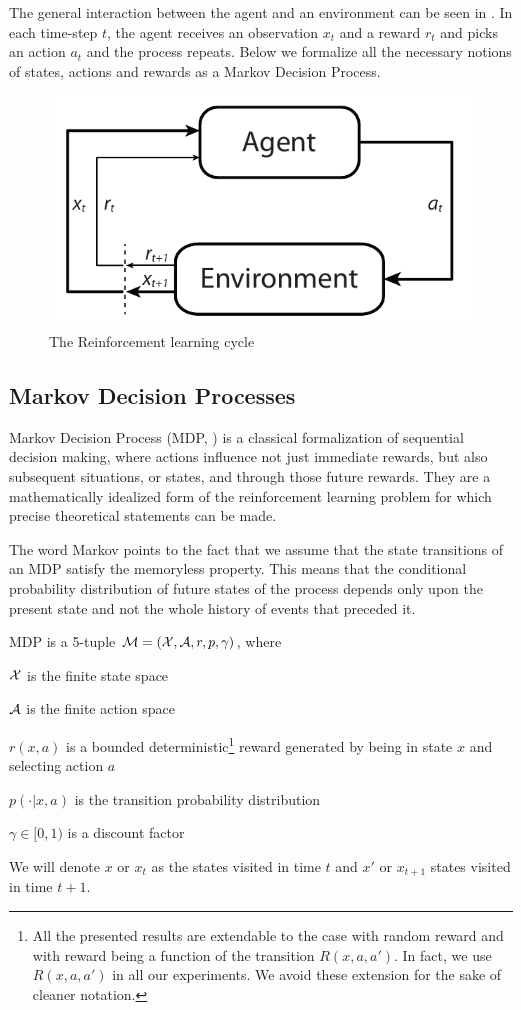 The general interaction between the agent and an environment can be seen in . In each time-step $t$, the agent receives an observation $x_t$ and a reward $r_t$ and picks an action $a_t$ and the process repeats. Below we formalize all the necessary notions of states, actions and rewards as a Markov Decision Process.

\begin{figure}[h]
\center
\includegraphics[width=.6\linewidth]{gfx/rl_loop.pdf}
\caption{The Reinforcement learning cycle}
\label{fig:rlloop}
\end{figure}

\subsection{Markov Decision Processes}

Markov Decision Process (MDP, \citet{bellman1957markovian}) is a classical formalization of sequential decision making, where actions influence not just immediate rewards, but also subsequent situations, or states, and through those future rewards. They are a mathematically idealized form of the reinforcement learning problem for which precise theoretical statements can be made.

The word Markov points to the fact that we assume that the state transitions of an MDP satisfy the memoryless property. This means that the conditional probability distribution of future states of the process depends only upon the present state and not the whole history of events that preceded it.

\begin{definition}

MDP is a 5-tuple $\mathcal{M} = (\mathcal{X}, \mathcal{A}, r, p, \gamma)$, where 

$\mathcal{X}$ is the finite state space

$\mathcal{A}$ is the finite action space

$r(x, a)$ is a bounded deterministic\footnote{All the presented results are extendable to the case with random reward and with reward being a function of the transition $R(x, a, a')$. In fact, we use $R(x, a, a')$ in all our experiments. We avoid these extension for the sake of cleaner notation.} reward generated by being in state $x$ and selecting action $a$

$p(\cdot|x, a)$ is the transition probability distribution

$\gamma \in [0, 1)$ is a discount factor
\end{definition}
We will denote $x$ or $x_t$ as the states visited in time $t$ and $x'$ or $x_{t+1}$ states visited in time $t+1$.

